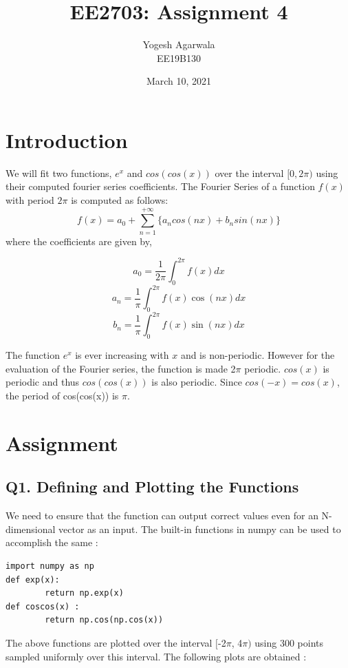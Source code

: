 \documentclass{article}
\title{EE2703: Assignment 4}
\author{Yogesh Agarwala \\ EE19B130}
\date{March 10, 2021}
\begin{document}
\maketitle

\section{Introduction}
We will fit two functions, $e^x$ and $cos(cos(x))$ over the interval $[0,2\pi)$ using their computed fourier series coefficients. The Fourier Series of a function $f(x)$ with period $2\pi$ is computed as follows:
\vspace{2mm}
\begin{equation*}
    f(x) = a_0 + \sum_{n=1}^{+\infty}\{ a_ncos(nx) +b_nsin(nx)\}
\end{equation*}
\vspace{2mm}
where the coefficients are given by, 


\[a_0 = \frac{1}{2\pi} \int_0^{2\pi}f(x)dx\]
\[a_n = \frac{1}{\pi} \int_0^{2\pi}f(x)\cos(nx)dx\]
\[b_n = \frac{1}{\pi} \int_0^{2\pi}f(x)\sin(nx)dx\]
\vspace{2mm}

The function $e^x$
is ever increasing with $x$ and is non-periodic. However
for the evaluation of the Fourier series, the function is made 2$\pi$ periodic. $cos(x)$ is periodic and thus $cos(cos(x))$ is also periodic. Since $cos(-x) =
cos(x)$, the period of cos(cos(x)) is $\pi$.

\newpage
\section{Assignment}
\subsection*{Q1. Defining and Plotting the Functions}
    We need to ensure that the function can output correct values even for an
    N-dimensional vector as an input. The built-in functions in numpy can be
    used to accomplish the same :
    \lstset{language=Python}
    \lstset{frame=lines}
    \lstset{basicstyle=\footnotesize}
    \begin{lstlisting}
import numpy as np
def exp(x):
      	return np.exp(x)
def coscos(x) :
      	return np.cos(np.cos(x))
    \end{lstlisting}
	The above functions are plotted over the interval $[$-2$\pi$, 4$\pi$$)$ using 300 points
	sampled uniformly over this interval. The following plots are obtained :
\end{document}
